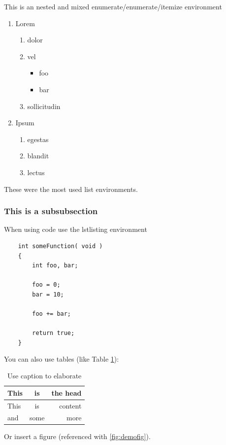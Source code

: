This is an nested and mixed enumerate/enumerate/itemize environment

\begin{enumerate}
	\item Lorem
		\begin{enumerate}
			\item dolor
			\item vel
				\begin{itemize}
					\item foo
					\item bar	
				\end{itemize}
			\item sollicitudin
		\end{enumerate}
	\item Ipsum
		\begin{enumerate}
			\item egestas
			\item blandit
			\item lectus
		\end{enumerate}
\end{enumerate}

These were the most used list environments.

\newpage
\subsubsection{This is a subsubsection}
When using code use the lstlisting environment

\begin{lstlisting}
	int someFunction( void ) 
	{
		int foo, bar;

		foo = 0;
		bar = 10;

		foo += bar;

		return true;
	}
\end{lstlisting}

You can also use tables (like Table \ref{tab:demotab}):

\begin{table} [h!]
	\begin{tabular}{l|c|r}
		This &is &the head\\
		\hline
		This 	&is 	&content\\
		and 	&some 	&more\\
	\end{tabular}
	\caption{Use caption to elaborate}
	\label{tab:demotab}
\end{table}

Or insert a figure (referenced with \ref{fig:demofig}).

